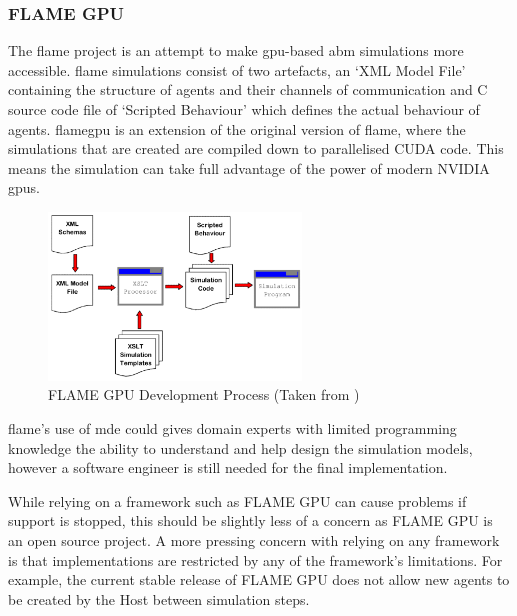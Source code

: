 \documentclass{UoYCSproject}
\begin{document}

\subsubsection{\gls{FLAME GPU}}
The \gls{flame} project is an attempt to make \gls{gpu}-based \gls{abm} simulations more accessible.
\gls{flame} simulations consist of two artefacts, an `XML Model File' containing the structure of agents and their channels of communication and C source code file of `Scripted Behaviour' which defines the actual behaviour of agents.
\acrfull{flamegpu} is an extension of the original version of \acrshort{flame}, where the simulations that are created are compiled down to parallelised CUDA code.
This means the simulation can take full advantage of the power of modern NVIDIA \acrshort{gpu}s.

\begin{figure}[htp]
\centering
\includegraphics[width=0.6\textwidth]{Appendix/FLAME_Process}
\caption{\gls{FLAME GPU} Development Process (Taken from \cite{flame_simulation})}
\label{fig:flame_dev}
\end{figure}

\gls{flame}'s use of \gls{mde} could gives domain experts with limited programming knowledge the ability to understand and help design the simulation models, however a software engineer is still needed for the final implementation.



While relying on a framework such as \gls{FLAME GPU} can cause problems if support is stopped, this should be slightly less of a concern as \gls{FLAME GPU} is an open source project.
A more pressing concern with relying on any framework is that implementations are restricted by any of the framework's limitations.
For example, the current stable release of \gls{FLAME GPU} does not allow new agents to be created by the \gls{Host} between simulation steps.
\end{document}

